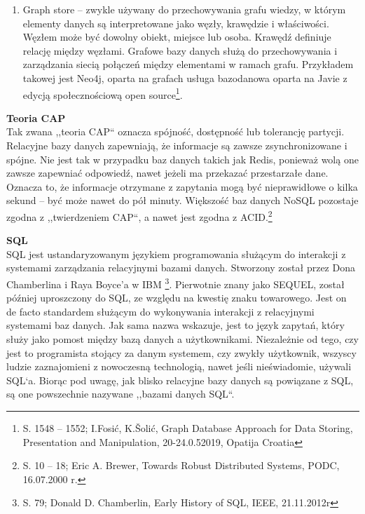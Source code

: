 \documentclass[12pt, a4paper, twoside, openany]{book}
\newcommand{\forceindent}{\leavevmode{\parindent=1.3em\indent}}
\begin{document}
\begin{enumerate}[label=--]
          Z kolei Apache Cassandra została zaprojektowana do zarządzania dużymi ilościami danych na wielu serwerach i w klastrach obejmujących wiele centrów danych.
          Jest ona wykorzystywana w różnych przypadkach, takich jak serwisy społecznościowe i analiza danych w czasie rzeczywistym\footnote{S. 118 -- 122; K. T. Sridhar, Modern Column Stores for Big Data Processing, XtremeData Technologies, Bangalore, India, 25.11.2017 r.}.
    \item Graph store -- zwykle używany do przechowywania grafu wiedzy, w którym elementy danych są interpretowane jako węzły, krawędzie i właściwości.
          Węzłem może być dowolny obiekt, miejsce lub osoba.
          Krawędź definiuje relację między węzłami.
          Grafowe bazy danych służą do przechowywania i zarządzania siecią połączeń między elementami w ramach grafu.
          Przykładem takowej jest Neo4j, oparta na grafach usługa bazodanowa oparta na Javie z edycją społecznościową open source\footnote{S. 1548 -- 1552; I.Fosić, K.Šolić, Graph Database Approach for Data Storing, Presentation and Manipulation, 20-24.0.52019, Opatija Croatia}.
\end{enumerate}

\textbf{Teoria CAP} \\
\forceindent Tak zwana ,,teoria CAP`` oznacza spójność, dostępność lub tolerancję partycji. Relacyjne bazy danych zapewniają, że informacje są zawsze zsynchronizowane i spójne. Nie jest tak w przypadku baz danych takich jak Redis, ponieważ wolą one zawsze zapewniać odpowiedź, nawet jeżeli ma przekazać przestarzałe dane. Oznacza to, że informacje otrzymane z zapytania mogą być nieprawidłowe o kilka sekund -- być może nawet do pół minuty. Większość baz danych NoSQL pozostaje zgodna z ,,twierdzeniem CAP``, a nawet jest zgodna z ACID.\footnote{S. 10 -- 18; Eric A. Brewer, Towards Robust Distributed Systems, PODC, 16.07.2000 r.}

\textbf{SQL\\}
\forceindent SQL jest ustandaryzowanym językiem programowania służącym do interakcji z systemami zarządzania relacyjnymi bazami danych. Stworzony został przez Dona Chamberlina i Raya Boyce'a w IBM \footnote{S. 79; Donald D. Chamberlin, Early History of SQL, IEEE, 21.11.2012r}.
Pierwotnie znany jako SEQUEL, został później uproszczony do SQL, ze względu na kwestię znaku towarowego.
Jest on de facto standardem służącym do wykonywania interakcji z relacyjnymi systemami baz danych.
Jak sama nazwa wskazuje, jest to język zapytań, który służy jako pomost między bazą danych a użytkownikami.
Niezależnie od tego, czy jest to programista stojący za danym systemem, czy zwykły użytkownik, wszyscy ludzie zaznajomieni z nowoczesną technologią, nawet jeśli nieświadomie, używali SQL`a.
Biorąc pod uwagę, jak blisko relacyjne bazy danych są powiązane z SQL, są one powszechnie nazywane ,,bazami danych SQL``.
\end{document}

